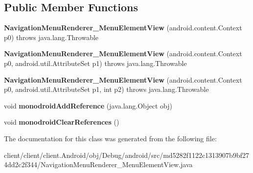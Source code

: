 \subsection*{Public Member Functions}
\begin{DoxyCompactItemize}
\item 
\hypertarget{classmd5282f1122c1313907b9bf274dd2c2f344_1_1NavigationMenuRenderer__MenuElementView_adf2750435e4101a76a0b8407c0535d09}{}{\bfseries Navigation\+Menu\+Renderer\+\_\+\+Menu\+Element\+View} (android.\+content.\+Context p0)  throws java.\+lang.\+Throwable 	\label{classmd5282f1122c1313907b9bf274dd2c2f344_1_1NavigationMenuRenderer__MenuElementView_adf2750435e4101a76a0b8407c0535d09}

\item 
\hypertarget{classmd5282f1122c1313907b9bf274dd2c2f344_1_1NavigationMenuRenderer__MenuElementView_afa7703a6a040e371591a7e6af7509848}{}{\bfseries Navigation\+Menu\+Renderer\+\_\+\+Menu\+Element\+View} (android.\+content.\+Context p0, android.\+util.\+Attribute\+Set p1)  throws java.\+lang.\+Throwable 	\label{classmd5282f1122c1313907b9bf274dd2c2f344_1_1NavigationMenuRenderer__MenuElementView_afa7703a6a040e371591a7e6af7509848}

\item 
\hypertarget{classmd5282f1122c1313907b9bf274dd2c2f344_1_1NavigationMenuRenderer__MenuElementView_a4401679b129dd06dfb8dec4d8e116dc7}{}{\bfseries Navigation\+Menu\+Renderer\+\_\+\+Menu\+Element\+View} (android.\+content.\+Context p0, android.\+util.\+Attribute\+Set p1, int p2)  throws java.\+lang.\+Throwable 	\label{classmd5282f1122c1313907b9bf274dd2c2f344_1_1NavigationMenuRenderer__MenuElementView_a4401679b129dd06dfb8dec4d8e116dc7}

\item 
\hypertarget{classmd5282f1122c1313907b9bf274dd2c2f344_1_1NavigationMenuRenderer__MenuElementView_ad3d6c9216e4da0a96ce44a33aeb1a577}{}void {\bfseries monodroid\+Add\+Reference} (java.\+lang.\+Object obj)\label{classmd5282f1122c1313907b9bf274dd2c2f344_1_1NavigationMenuRenderer__MenuElementView_ad3d6c9216e4da0a96ce44a33aeb1a577}

\item 
\hypertarget{classmd5282f1122c1313907b9bf274dd2c2f344_1_1NavigationMenuRenderer__MenuElementView_a30225c0c5e984fa3f125fafc3f59bac9}{}void {\bfseries monodroid\+Clear\+References} ()\label{classmd5282f1122c1313907b9bf274dd2c2f344_1_1NavigationMenuRenderer__MenuElementView_a30225c0c5e984fa3f125fafc3f59bac9}

\end{DoxyCompactItemize}


The documentation for this class was generated from the following file\+:\begin{DoxyCompactItemize}
\item 
client/client/client.\+Android/obj/\+Debug/android/src/md5282f1122c1313907b9bf274dd2c2f344/Navigation\+Menu\+Renderer\+\_\+\+Menu\+Element\+View.\+java\end{DoxyCompactItemize}
